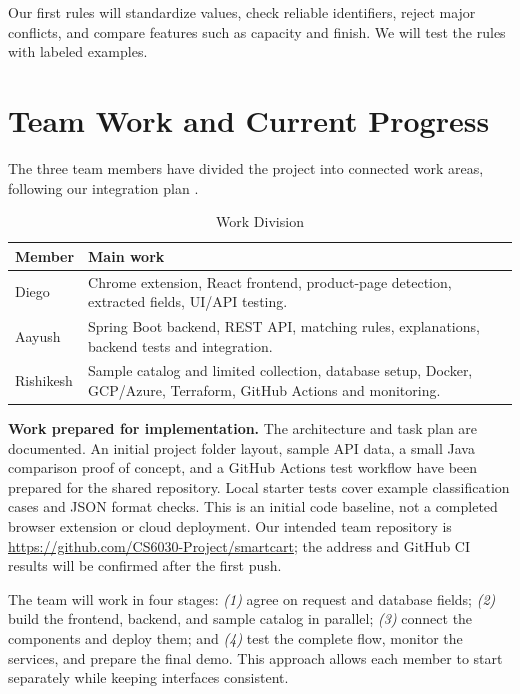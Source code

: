 \documentclass[conference,10pt]{IEEEtran}
\begin{document}
Our first rules will standardize values, check reliable identifiers, reject major conflicts, and compare features such as capacity and finish. We will test the rules with labeled examples.

\section{Team Work and Current Progress}
The three team members have divided the project into connected work areas, following our integration plan \cite{teamplan}.

\begin{table}[t]
\caption{Work Division}
\centering\footnotesize
\setlength{\tabcolsep}{3pt}
\renewcommand{\arraystretch}{1.12}
\begin{tabular}{p{}p{}}
\toprule
\textbf{Member} & \textbf{Main work} \\
\midrule
Diego & Chrome extension, React frontend, product-page detection, extracted fields, UI/API testing. \\
Aayush & Spring Boot backend, REST API, matching rules, explanations, backend tests and integration. \\
Rishikesh & Sample catalog and limited collection, database setup, Docker, GCP/Azure, Terraform, GitHub Actions and monitoring. \\
\bottomrule
\end{tabular}
\end{table}

\textbf{Work prepared for implementation.} The architecture and task plan are documented. An initial project folder layout, sample API data, a small Java comparison proof of concept, and a GitHub Actions test workflow have been prepared for the shared repository. Local starter tests cover example classification cases and JSON format checks. This is an initial code baseline, not a completed browser extension or cloud deployment. Our intended team repository is \url{https://github.com/CS6030-Project/smartcart}; the address and GitHub CI results will be confirmed after the first push.

The team will work in four stages: \emph{(1)} agree on request and database fields; \emph{(2)} build the frontend, backend, and sample catalog in parallel; \emph{(3)} connect the components and deploy them; and \emph{(4)} test the complete flow, monitor the services, and prepare the final demo. This approach allows each member to start separately while keeping interfaces consistent.
\end{document}
